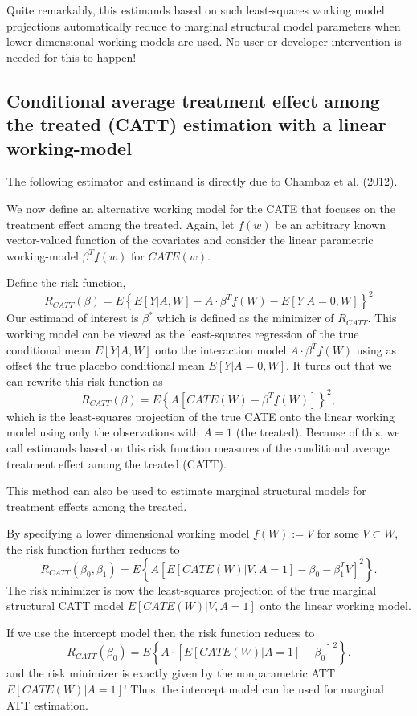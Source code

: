\documentclass{article}
\begin{document}
Quite remarkably, this estimands based on such least-squares working model projections automatically reduce to marginal structural model parameters when lower dimensional working models are used. No user or developer intervention is needed for this to happen!

\subsection{Conditional average treatment effect among the treated (CATT) estimation with a linear working-model}
The following estimator and estimand is directly due to Chambaz et al. (2012).\nocite{ChambazLaanVarimp}

We now define an alternative working model for the CATE that focuses on the treatment effect among the treated. Again, let $\underline{f}(w)$ be an arbitrary known vector-valued function of the covariates and consider the linear parametric working-model $\beta^T \underline{f}(w)$ for $CATE(w)$. 

Define the risk function,
$$R_{CATT}(\beta) = E \left\{E[Y|A,W] - A \cdot \beta^T \underline{f}(W) - E[Y|A=0,W]\right\}^2$$
Our estimand of interest is $\beta^*$ which is defined as the minimizer of $R_{CATT}$. This working model can be viewed as the least-squares regression of the true conditional mean $E[Y|A,W]$ onto the interaction model $A \cdot \beta^T \underline{f}(W) $ using as offset the true placebo conditional mean $E[Y|A=0,W]$. It turns out that we can rewrite this risk function as 
$$R_{CATT}(\beta) = E \left\{A \left[CATE(W) - \beta^T \underline{f}(W)  \right]  \right\}^2,$$
which is the least-squares projection of the true CATE onto the linear working model using only the observations with $A=1$ (the treated). Because of this, we call estimands based on this risk function measures of the conditional average treatment effect among the treated (CATT).

This method can also be used to estimate marginal structural models for treatment effects among the treated.

By specifying a lower dimensional working model $\underline{f}(W) := V$ for some $V \subset W$, the risk function further reduces to
$$R_{CATT}(\beta_0, \beta_1) = E \left\{A\left[E[CATE(W)|V,A=1] - \beta_0 - \beta_1^T V\right]^2 \right\}.$$
The risk minimizer is now the least-squares projection of the true marginal structural CATT model $E[CATE(W)|V, A=1]$ onto the linear working model.


If we use the intercept model then the risk function reduces to
$$R_{CATT}(\beta_0) = E \left\{ A\cdot \left[E[CATE(W)|A=1] - \beta_0 \right]^2 \right\}.$$
and the risk minimizer is exactly given by the nonparametric ATT $E[CATE(W)|A=1]$! Thus, the intercept model can be used for marginal ATT estimation.
\end{document}
